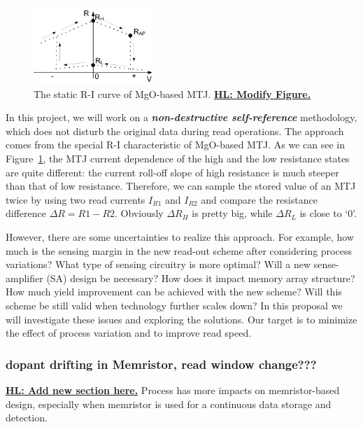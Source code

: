 \begin{figure}\centering \centering
\vspace{-18pt}
\includegraphics[width=0.4\textwidth]{./figure/RIcurve.pdf}
\caption{The static R-I curve of MgO-based MTJ. \textbf{\underline{HL: Modify Figure.}}}\label{mtj-RI}
\end{figure}

In this project, we will work on a \textbf{\textit{non-destructive self-reference}} methodology, which does not disturb the original data during read operations. The approach comes from the special R-I characteristic of MgO-based MTJ. As we can see in Figure~\ref{mtj-RI}, the MTJ current dependence of the high and the low resistance states are quite different: the current roll-off slope of high resistance is much steeper than that of low resistance. Therefore, we can sample the stored value of an MTJ twice by using two read currents $I_{R1}$ and $I_{R2}$ and compare the resistance difference ${\Delta}R=R1-R2$. Obviously ${\Delta}R_H$ is pretty big, while ${\Delta}R_L$ is close to `0'.

However, there are some uncertainties to realize this approach. For example, how much is the sensing margin in the new read-out scheme after considering process variations? What type of sensing circuitry is more optimal? Will a new sense-amplifier (SA) design be necessary? How does it impact memory array structure? How much yield improvement can be achieved with the new scheme? Will this scheme be still valid when technology further scales down? In this proposal we will investigate these issues and exploring the solutions. Our target is to minimize the effect of process variation and to improve read speed.

\subsubsection{dopant drifting in Memristor, read window change???}
\textbf{\underline{HL: Add new section here.}}
Process has more impacts on memristor-based design, especially when memristor is used for a continuous data storage and detection.


